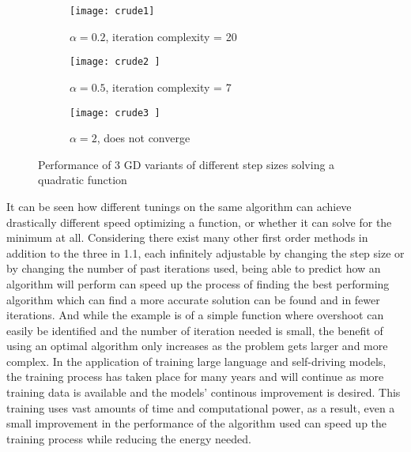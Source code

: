 \begin{figure}[h!]
  \centering
  \begin{subfigure}{.5\textwidth}
    \centering
    \texttt{[image: crude1]}
    \caption{$\alpha = 0.2$, iteration complexity = 20}
    \label{fig:crude1}
  \end{subfigure}%
  \begin{subfigure}{.5\textwidth}
    \centering
    \texttt{[image: crude2 ]}
    \caption{$\alpha = 0.5$, iteration complexity = 7}
    \label{fig:crude2}
  \end{subfigure}
  \begin{subfigure}{.5\textwidth}
    \centering
    \texttt{[image: crude3 ]}
    \caption{$\alpha = 2$, does not converge}
    \label{fig:crude3}
  \end{subfigure}
  \caption{Performance of 3 GD variants of different step sizes solving a quadratic function}
\label{fig:test}
\end{figure}


It can be seen how different tunings on the same algorithm can achieve drastically different speed optimizing a function, or whether it can solve for the minimum at all. Considering there exist many other first order methods in addition to the three in 1.1, each infinitely adjustable by changing the step size or by changing the number of past iterations used, being able to predict how an algorithm will perform can speed up the process of finding the best performing algorithm which can find a more accurate solution can be found and in fewer iterations. And while the example is of a simple function where overshoot can easily be identified and the number of iteration needed is small, the benefit of using an optimal algorithm only increases as the problem gets larger and more complex. In the application of training large language and self-driving models, the training process has taken place for many years and will continue as more training data is available and the models' continous improvement is desired. This training uses vast amounts of time and computational power, as a result, even a small improvement in the performance of the algorithm used can speed up the training process while reducing the energy needed.

